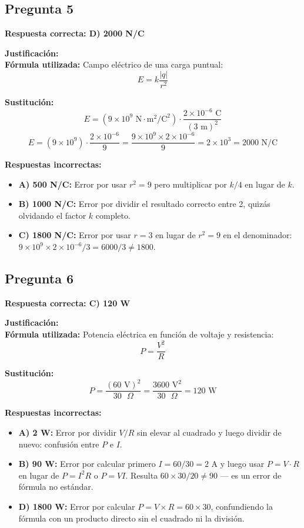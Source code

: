 \begin{respuestabox}
\subsection*{Pregunta 5}
\textcolor{verdecorrecto}{\textbf{Respuesta correcta: D) 2000 N/C}}

\textbf{Justificación:}\\
\textbf{Fórmula utilizada:} Campo eléctrico de una carga puntual:
$$E = k \frac{|q|}{r^2}$$

\textbf{Sustitución:}
$$E = (9 \times 10^9 \text{ N}\cdot\text{m}^2/\text{C}^2) \cdot \frac{2 \times 10^{-6} \text{ C}}{(3 \text{ m})^2}$$
$$E = (9 \times 10^9) \cdot \frac{2 \times 10^{-6}}{9} = \frac{9 \times 10^9 \times 2 \times 10^{-6}}{9} = 2 \times 10^3 = 2000 \text{ N/C}$$

\textbf{Respuestas incorrectas:}
\begin{itemize}
    \item \textbf{A) 500 N/C:} Error por usar $r^2 = 9$ pero multiplicar por $k/4$ en lugar de $k$.
    \item \textbf{B) 1000 N/C:} Error por dividir el resultado correcto entre 2, quizás olvidando el factor $k$ completo.
    \item \textbf{C) 1800 N/C:} Error por usar $r = 3$ en lugar de $r^2 = 9$ en el denominador: $9\times10^9 \times 2\times10^{-6} / 3 = 6000/3 \neq 1800$.
\end{itemize}
\end{respuestabox}

\begin{respuestabox}
\subsection*{Pregunta 6}
\textcolor{verdecorrecto}{\textbf{Respuesta correcta: C) 120 W}}

\textbf{Justificación:}\\
\textbf{Fórmula utilizada:} Potencia eléctrica en función de voltaje y resistencia:
$$P = \frac{V^2}{R}$$

\textbf{Sustitución:}
$$P = \frac{(60 \text{ V})^2}{30 \text{ }\Omega} = \frac{3600 \text{ V}^2}{30 \text{ }\Omega} = 120 \text{ W}$$

\textbf{Respuestas incorrectas:}
\begin{itemize}
    \item \textbf{A) 2 W:} Error por dividir $V/R$ sin elevar al cuadrado y luego dividir de nuevo: confusión entre $P$ e $I$.
    \item \textbf{B) 90 W:} Error por calcular primero $I = 60/30 = 2$ A y luego usar $P = V \cdot R$ en lugar de $P = I^2 R$ o $P = VI$. Resulta $60 \times 30/20 \neq 90$ — es un error de fórmula no estándar.
    \item \textbf{D) 1800 W:} Error por calcular $P = V \times R = 60 \times 30$, confundiendo la fórmula con un producto directo sin el cuadrado ni la división.
\end{itemize}
\end{respuestabox}

